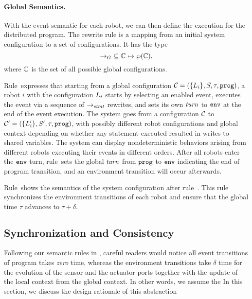 \paragraph{Global Semantics.}

With the event semantic for each robot, we can then define the execution for the distributed \lgname program.
The rewrite rule is a mapping from an initial system configuration to a set of configurations.
It has the type
\[
\rightarrow_G\ \subseteq \mathbb{C} \mapsto \wp(\mathbb{C}),
\]
where $\mathbb{C}$ is the set of all possible global configurations.

Rule~\EventTransRule expresses that starting from a global configuration $\mathcal{C} = (\{L_{i}\}, S, \tau, \mathtt{prog})$,
a robot $i$ with the configuration $L_{i}$ starts by selecting an enabled event,
executes the event via a sequence of $\rightarrow_\mathit{stmt}$ rewrites,
and sets its own $\mathit{turn}$ to $\mathtt{env}$ at the end of the event execution.
The system goes from a configuration $\mathcal{C}$ to $\mathcal{C}^{\prime}= (\{L_{i}^\prime\}, S^{\prime}, \tau, \mathtt{prog})$,
with possibly different robot configurations and global context depending on
whether any statement executed resulted in writes to shared variables.
The system can display nondeterministic behaviors arising from different robots executing their events in different orders.
After all robots enter the $\mathtt{env}$ turn, rule~\EndProgTransRule sets the global $\mathit{turn}$ from $\mathtt{prog}$ to $\mathtt{env}$
indicating the end of program transition, and an environment transition will occur afterwards.

Rule~\EnvTransRule shows the semantics of the system configuration after rule~\EndProgTransRule.
This rule synchronizes the environment transitions of each robot and
ensure that the global time $\tau$ advances to $\tau + \delta$.


\subsection{Synchronization and Consistency}
\label{sec:sync}

Following our semantic rules in ,
careful readers would notice all event transitions of \lgname program takes \emph{zero} time,
whereas the environment transitions take $\delta$ time for the evolution of the sensor and the actuator ports
together with the update of the local context from the global context.
In other words, we assume the 
In this section, we discuss the design rationale of this abstraction

%

